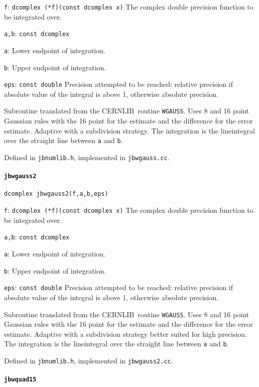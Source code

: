\documentclass[12pt,a4paper]{article}
\newcommand{\mytt}[1]{\texttt{#1}}
\newcommand{\newfunction}[1]{\mytt{#1}\index{\mytt{#1}}}
\newcommand{\cernlib}{\textsc{CERNLIB}\cite{cernlib}}
\begin{document}
\mytt{f}: \mytt{dcomplex (*f)(const dcomplex x)} The complex double precision
function to be integrated over.

\mytt{a,b}: \mytt{const dcomplex}

\mytt{a}: Lower endpoint of integration.

\mytt{b}: Upper endpoint of integration.

\mytt{eps}: \mytt{const double} Precision attempted to be reached:
relative precision if absolute
value of the integral is above 1, otherwise absolute precision.

Subroutine translated from the \cernlib\ routine \mytt{WGAUSS}. Uses
8 and 16 point Gaussian rules with the 16 point for the estimate
and the difference for the error estimate. Adaptive with a subdivision strategy.
The integration is the
lineintegral over the straight line between \mytt{a} and \mytt{b}.

Defined in \mytt{jbnumlib.h}, implemented in \mytt{jbwgauss.cc}.

\paragraph{\newfunction{jbwgauss2}}

\mytt{dcomplex jbwgauss2(f,a,b,eps)}

\mytt{f}: \mytt{dcomplex (*f)(const dcomplex x)} The complex double precision
function to be integrated over.

\mytt{a,b}: \mytt{const dcomplex}

\mytt{a}: Lower endpoint of integration.

\mytt{b}: Upper endpoint of integration.

\mytt{eps}: \mytt{const double} Precision attempted to be reached:
relative precision if absolute
value of the integral is above 1, otherwise absolute precision.

Subroutine translated from the \cernlib\ routine \mytt{WGAUSS}. Uses
8 and 16 point Gaussian rules with the 16 point for the estimate
and the difference for the error estimate. Adaptive with a subdivision strategy
better suited for high precision.
The integration is the
lineintegral over the straight line between \mytt{a} and \mytt{b}.

Defined in \mytt{jbnumlib.h}, implemented in \mytt{jbwgauss2.cc}.

\paragraph{\newfunction{jbwquad15}}
\end{document}
